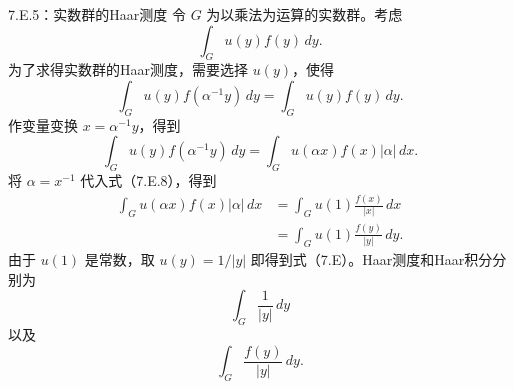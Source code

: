 \begin{bookexample}{7.E.5：实数群的Haar测度}
令 $G$ 为以乘法为运算的实数群。考虑
\[
\int_Gu(y)f(y)\,dy.
\]
为了求得实数群的Haar测度，需要选择 $u(y)$，使得
\begin{equation}
\int_Gu(y)f(\alpha^{-1}y)\,dy=\int_Gu(y)f(y)\,dy.\tag{7.E.7}
\end{equation}
作变量变换 $x=\alpha^{-1}y$，得到
\begin{equation}
\int_Gu(y)f(\alpha^{-1}y)\,dy=\int_Gu(\alpha x)f(x)|\alpha|\,dx.\tag{7.E.8}
\end{equation}
将 $\alpha=x^{-1}$ 代入式（7.E.8），得到
\begin{equation}
\begin{aligned}
\int_Gu(\alpha x)f(x)|\alpha|\,dx
 &=\int_Gu(1)\frac{f(x)}{|x|}\,dx\\
 &=\int_Gu(1)\frac{f(y)}{|y|}\,dy.
\end{aligned}\tag{7.E.9}
\end{equation}
由于 $u(1)$ 是常数，取 $u(y)=1/|y|$ 即得到式（7.E）。Haar测度和Haar积分分别为
\begin{equation}
\int_G\frac1{|y|}\,dy\tag{7.E.10}
\end{equation}
以及
\begin{equation}
\int_G\frac{f(y)}{|y|}\,dy.\tag{7.E.11}
\end{equation}
\end{bookexample}

